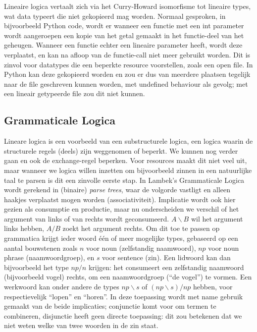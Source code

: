 Lineaire logica vertaalt zich via het Curry-Howard isomorfisme tot lineaire types, wat data typeert die niet gekopieerd mag worden. Normaal gesproken, in bijvoorbeeld Python code, wordt er wanneer een functie met een \textsf{int} parameter wordt aangeroepen een kopie van het getal gemaakt in het functie-deel van het geheugen. Wanneer een functie echter een lineaire parameter heeft, wordt deze verplaatst, en kan na afloop van de functie-call niet meer gebruikt worden. Dit is zinvol voor datatypes die een beperkte resource voorstellen, zoals een open file. In Python kan deze gekopieerd worden en zou er dus van meerdere plaatsen tegelijk naar de file geschreven kunnen worden, met undefined behaviour als gevolg; met een lineair getypeerde file zou dit niet kunnen.

\subsection{Grammaticale Logica}
Lineare logica is een voorbeeld van een substructurele logica, een logica waarin de structurele regels (deels) zijn weggenomen of beperkt. We kunnen nog verder gaan en ook de exchange-regel beperken. Voor resources maakt dit niet veel uit, maar wanneer we logica willen inzetten om bijvoorbeeld zinnen in een natuurlijke taal te parsen is dit een zinvolle eerste stap. In Lambek's {Grammaticale Logica} wordt gerekend in (binaire) \emph{parse trees}, waar de volgorde vastligt en alleen haakjes verplaatst mogen worden (associativiteit). Implicatie wordt ook hier gezien als consumptie en productie, maar nu onderscheiden we verschil of het argument van links of van rechts wordt geconsumeerd. $A \backslash B$ wil het argument links hebben, $A / B$ zoekt het argument rechts. Om dit toe te passen op grammatica krijgt ieder woord \'e\'en of meer mogelijke types, gebaseerd op een aantal bouwstenen zoals $n$ voor noun (zelfstandig naamwoord), $np$ voor noun phrase (naamwoordgroep), en $s$ voor sentence (zin). Een lidwoord kan dan bijvoorbeeld het type $np / n$ krijgen: het consumeert een zelfstandig naamwoord (bijvoorbeeld vogel) rechts, om een naamwoordgroep (\enquote{de vogel}) te vormen. Een werkwoord kan onder andere de types $np \backslash s$ of $(np \backslash s) / np$ hebben, voor respectievelijk \enquote{lopen} en \enquote{horen}. In deze toepassing wordt met name gebruik gemaakt van de beide implicaties; conjunctie komt voor om termen te combineren, disjunctie heeft geen directe toepassing: dit zou betekenen dat we niet weten welke van twee woorden in de zin staat.


